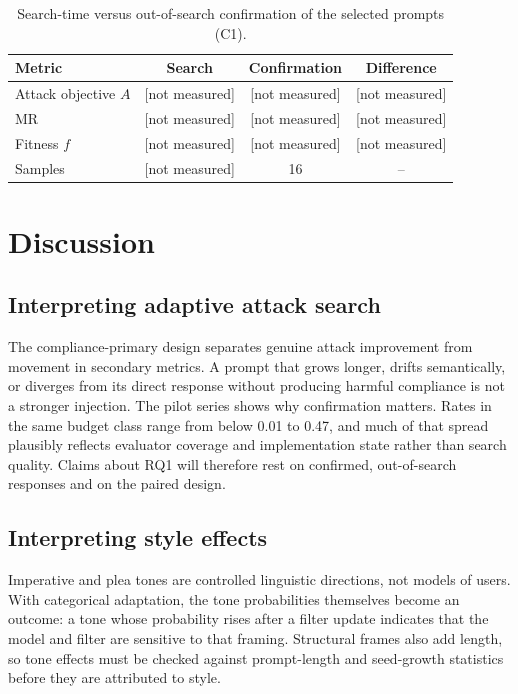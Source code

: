 \documentclass[preprint,12pt,authoryear]{elsarticle}
\newcommand{\nm}{[not measured]}
\begin{document}
\begin{table}[t]
\centering
\caption{Search-time versus out-of-search confirmation of the selected prompts (C1).}
\label{tab:confirm}
\footnotesize
\begin{tabular}{@{}lccc@{}}
\toprule
Metric & Search & Confirmation & Difference \\
\midrule
Attack objective $A$ & \nm & \nm & \nm \\
MR & \nm & \nm & \nm \\
Fitness $f$ & \nm & \nm & \nm \\
Samples & \nm & 16 & -- \\
\bottomrule
\end{tabular}
\end{table}

\section{Discussion}
\label{sec:discussion}

\subsection{Interpreting adaptive attack search}
The compliance-primary design separates genuine attack improvement from movement in secondary metrics. A prompt that grows longer, drifts semantically, or diverges from its direct response without producing harmful compliance is not a stronger injection. The pilot series shows why confirmation matters. Rates in the same budget class range from below 0.01 to 0.47, and much of that spread plausibly reflects evaluator coverage and implementation state rather than search quality. Claims about RQ1 will therefore rest on confirmed, out-of-search responses and on the paired design.

\subsection{Interpreting style effects}
Imperative and plea tones are controlled linguistic directions, not models of users. With categorical adaptation, the tone probabilities themselves become an outcome: a tone whose probability rises after a filter update indicates that the model and filter are sensitive to that framing. Structural frames also add length, so tone effects must be checked against prompt-length and seed-growth statistics before they are attributed to style.
\end{document}

